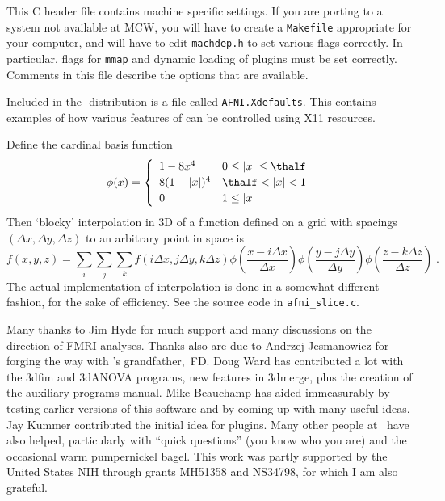 This C header file contains machine specific settings.  If you are
porting \afnit to a system not available at MCW, you will have
to create a {\tt Makefile} appropriate for your computer, and will
have to edit {\tt machdep.h} to set various flags correctly.
In particular, flags for {\tt mmap} and dynamic loading of
plugins must be set correctly.  Comments in this file describe
the options that are available.

Included in the \MCW$\!$ \afnit distribution is a file called
{\tt AFNI.Xdefaults}.  This contains examples of how various
features of \afnit can be controlled using X11 resources.


Define the cardinal basis function
\begin{displaymath}
  \phi(x) =
    \left\{ \begin{array}{ll}
               1 - 8 x^4 & 0 \leq |x| \leq \thalf \\[.5ex]
%
               8 (1-|x|)^4 & \thalf < |x| < 1 \\[.5ex]
%
               0          & 1 \leq |x|
    \end{array}\right.
\end{displaymath}
Then `blocky' interpolation in 3D of a function defined on a grid
with spacings $(\Delta x,\Delta y,\Delta z)$ to an arbitrary point in space is
\begin{displaymath}
  f(x,y,z) = \sum_i \sum_j \sum_k f(i\Delta x,j\Delta y,k\Delta z)
                                  \phi\left(\frac{x-i\Delta x}{\Delta x}\right)
                                  \phi\left(\frac{y-j\Delta y}{\Delta y}\right)
                                  \phi\left(\frac{z-k\Delta z}{\Delta z}\right) \;.
\end{displaymath}
The actual implementation of interpolation is done in a somewhat
different fashion, for the sake of efficiency.  See the source
code in {\tt afni\_slice.c}.

Many thanks to Jim Hyde for much support and many discussions on the
direction of FMRI analyses.  Thanks also are due to Andrzej Jesmanowicz
for forging the way with \afni's grandfather,~{\sf FD}\@.
Doug Ward has contributed a lot with the {\sf 3dfim} and {\sf 3dANOVA}
programs, new features in {\sf 3dmerge}, plus the creation of the auxiliary
programs manual.
Mike Beauchamp has aided immeasurably by testing earlier versions
of this software and by coming up with many useful ideas.
Jay Kummer contributed the initial idea for plugins.
Many other people at \MCW\ have also helped, particularly
with ``quick questions'' (you know who you are) and the
occasional warm pumpernickel bagel.
This work was partly supported by the United States NIH through
grants MH51358 and NS34798, for which I am also grateful.


